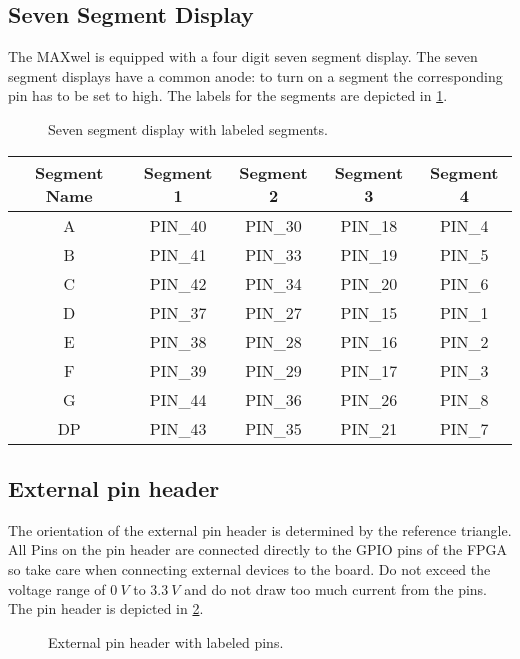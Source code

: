 \subsection{Seven Segment Display}
The MAXwel is equipped with a four digit seven segment display.
The seven segment displays have a common anode: to turn on a segment the corresponding pin has to be set to high.
The labels for the segments are depicted in \cref{fig:seven_segment_display}.

\begin{figure}[h!]
    \centering
    
    \caption{Seven segment display with labeled segments.}
    \label{fig:seven_segment_display}
\end{figure}

\begin{center}
	\begin{tabular}{c c c c c}
		Segment Name & Segment 1 & Segment 2 & Segment 3 & Segment 4 \\
		\hline
		A & PIN\_40 & PIN\_30 & PIN\_18 & PIN\_4 \\
		B & PIN\_41 & PIN\_33 & PIN\_19 & PIN\_5 \\
		C & PIN\_42 & PIN\_34 & PIN\_20 & PIN\_6 \\
		D & PIN\_37 & PIN\_27 & PIN\_15 & PIN\_1 \\
		E & PIN\_38 & PIN\_28 & PIN\_16 & PIN\_2 \\
		F & PIN\_39 & PIN\_29 & PIN\_17 & PIN\_3 \\
		G & PIN\_44 & PIN\_36 & PIN\_26 & PIN\_8 \\
		DP & PIN\_43 & PIN\_35 & PIN\_21 & PIN\_7 \\
		\hline
	\end{tabular}
\end{center}

\subsection{External pin header}
The orientation of the external pin header is determined by the reference triangle.
All Pins on the pin header are connected directly to the GPIO pins of the FPGA so take care when connecting external devices to the board.
Do not exceed the voltage range of $\SI{0}{V}$ to $\SI{3.3}{V}$ and do not draw too much current from the pins.
The pin header is depicted in \cref{fig:external_pin_header}.

\begin{figure}[h!]
    \centering
    
    \caption{External pin header with labeled pins.}
    \label{fig:external_pin_header}
\end{figure}

